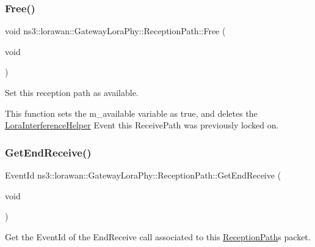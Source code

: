 \subsubsection{\texorpdfstring{Free()}{Free()}}
{\footnotesize\ttfamily void ns3\+::lorawan\+::\+Gateway\+Lora\+Phy\+::\+Reception\+Path\+::\+Free (\begin{DoxyParamCaption}\item[{void}]{ }\end{DoxyParamCaption})}

Set this reception path as available.

This function sets the m\+\_\+available variable as true, and deletes the \hyperlink{classns3_1_1lorawan_1_1LoraInterferenceHelper}{Lora\+Interference\+Helper} Event this Receive\+Path was previously locked on. \mbox{\label{classns3_1_1lorawan_1_1GatewayLoraPhy_1_1ReceptionPath_a253268855de9a388a960e910d3a20fbc}} 
\subsubsection{\texorpdfstring{Get\+End\+Receive()}{GetEndReceive()}}
{\footnotesize\ttfamily Event\+Id ns3\+::lorawan\+::\+Gateway\+Lora\+Phy\+::\+Reception\+Path\+::\+Get\+End\+Receive (\begin{DoxyParamCaption}\item[{void}]{ }\end{DoxyParamCaption})}

Get the Event\+Id of the End\+Receive call associated to this \hyperlink{classns3_1_1lorawan_1_1GatewayLoraPhy_1_1ReceptionPath}{Reception\+Path}\textquotesingle{}s packet. \mbox{\label{classns3_1_1lorawan_1_1GatewayLoraPhy_1_1ReceptionPath_a5ba2eb1b0705b0d91e2702fdc3d56231}} 
